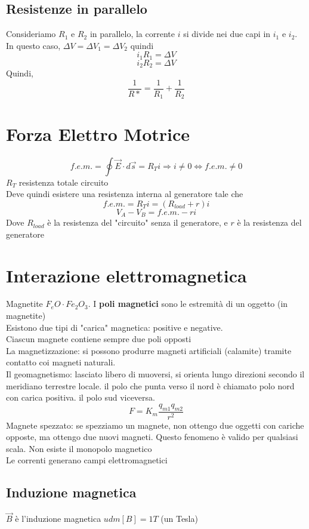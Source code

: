 \documentclass[a4paper]{report}
\begin{document}
  \subsection{Resistenze in parallelo}
  Consideriamo $R_1$ e $R_2$ in parallelo, la corrente $i$ si divide nei due capi in $i_1$ e $i_2$. In questo caso, $\Delta V = \Delta V_1 = \Delta V_2$ quindi
  $$ i_1 R_1 = \Delta V $$
  $$ i_2 R_2 = \Delta V $$
  Quindi,
  $$ \frac{1}{R*} = \frac{1}{R_1} + \frac{1}{R_2} $$

  \section{Forza Elettro Motrice}
  $$ f.e.m. = \oint \vec{E} \cdot d\vec{s} = R_T i \Rightarrow i \neq 0 \iff f.e.m. \neq 0$$
  $R_T$ resistenza totale circuito\\
  Deve quindi esistere una resistenza interna al generatore tale che
  $$ f.e.m. = R_T i = (R_{load} + r)i $$
  $$ V_A - V_B = f.e.m. -ri $$
  Dove $R_{load}$ è la resistenza del "circuito" senza il generatore, e $r$ è la resistenza del generatore

  \section{Interazione elettromagnetica}
  Magnetite $F_eO \cdot Fe_2O_3$. I \textbf{poli magnetici} sono le estremità di un oggetto (in magnetite)\\
  Esistono due tipi di "carica" magnetica: positive e negative.\\
  Ciascun magnete contiene sempre due poli opposti\\
  La magnetizzazione: si possono produrre magneti artificiali (calamite) tramite contatto coi magneti naturali.\\
  Il geomagnetismo: lasciato libero di muoversi, si orienta lungo direzioni secondo il meridiano terrestre locale. il polo che punta verso il nord è chiamato polo nord con carica positiva. il polo sud viceversa.\\
  $$F = K_m \frac{q_{m1}q_{m2}}{r^2}$$
  Magnete spezzato: se spezziamo un magnete, non ottengo due oggetti con cariche opposte, ma ottengo due nuovi magneti. Questo fenomeno è valido per qualsiasi scala. Non esiste il monopolo magnetico\\
  Le correnti generano campi elettromagnetici
  \subsection{Induzione magnetica}
  $\vec{B}$ è l'induzione magnetica $udm[B] = 1T$ (un Tesla)
\end{document}

